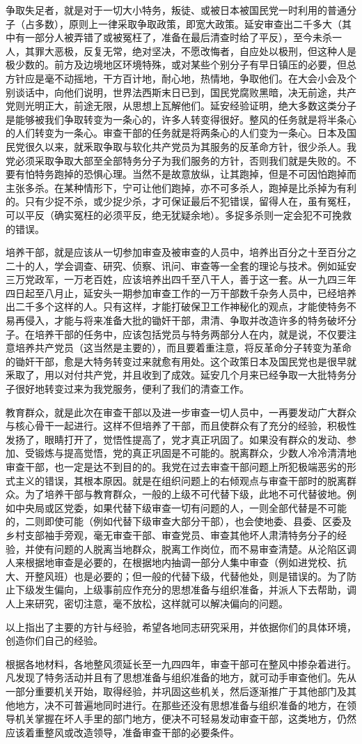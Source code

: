 争取失足者，就是对于一切大小特务，叛徒、或被日本被国民党一时利用的普通分子（占多数），原则上一律采取争取政策，即宽大政策。延安审查出二千多大（其中有一部分人被弄错了或被冤枉了，准备在最后清查时给了平反），至今未杀一人，其罪大恶极，反复无常，绝对坚决，不愿改悔者，自应处以极刑，但这种人是极少数的。前方及边境地区环境特殊，或对某些个别分子有早日镇压的必要，但总方针应是毫不动摇地，干方百计地，耐心地，热情地，争取他们。在大会小会及个别谈话中，向他们说明，世界法西斯末日已到，国民党腐败黑暗，决无前途，共产党则光明正大，前途无限，从思想上瓦解他们。延安经验证明，绝大多数这类分子是能够被我们争取转变为一条心的，许多人转变得很好。整风的任务就是将半条心的人们转变为一条心。审查干部的任务就是将两条心的人们变为一条心。日本及国民党很久以来，就釆取争取与软化共产党员为其服务的反革命方针，很少杀人。我党必须采取争取大部至全部特务分子为我们服务的方针，否则我们就是失败的。不要有怕特务跑掉的恐惧心理。当然不是故意放纵，让其跑掉，但是不可因怕跑掉而主张多杀。在某种情形下，宁可让他们跑掉，亦不可多杀人，跑掉是比杀掉为有利的。只有少捉不杀，或少捉少杀，才可保证最后不犯错误，留得人在，虽有冤枉，可以平反（确实冤枉的必须平反，绝无犹疑余地）。多捉多杀则一定会犯不可挽救的错误。

培养干部，就是应该从一切参加审查及被审查的人员中，培养出百分之十至百分之二十的人，学会调查、研究、侦察、讯问、审查等一全套的理论与技术。例如延安三万党政军，一万老百姓，应该培养出四千至八干人，善于这一套。从一九四三年四日起至八月止，延安头一期参加审查工作的一万干部数千杂务人员中，已经培养出二千多个这样的人。只有这样，才能打破保卫工作神秘化的观点，才能使特务不易再侵入，才能与将来准备大批的锄奸干部，肃清、争取并改造许多的特务破坏分子。在培养干部的任务中，应该包括党员与特务两部分人在内，就是说，不仅要注意培养共产党员（这当然是主要的），而且要着重注意，将反革命分子转变为革命的锄奸干部，愈是大特务转变过来就愈有用处。这个政策日本及国民党也是很早就釆取了，用以对付共产党，并且收到了成效。延安几个月来已经争取一大批特务分子很好地转变过来为我党服务，便利了我们的清查工作。

教育群众，就是此次在审查干部以及进一步审查一切人员中，一再要发动广大群众与核心骨干一起进行。这样不但培养了干部，而且使群众有了充分的经验，积极性发扬了，眼睛打开了，觉悟性提高了，党才真正巩固了。如果没有群众的发动、参加、受锻炼与提高觉悟，党的真正巩固是不可能的。脱离群众，少数人冷冷清清地审查干部，也一定是达不到目的的。我党在过去审查干部问题上所犯极端恶劣的形式主义的错误，其根本原因。就是在组织问题上的右倾观点与审查干部时的脱离群众。为了培养干部与教育群众，一般的上级不可代替下级，此地不可代替彼地。例如中央局或区党委，如果代替下级审查一切有问题的人，一则全部代替是不可能的，二则即使可能（例如代替下级审查大部分干部），也会使地委、县委、区委及乡村支部袖手旁观，毫无审查干部、审查党员、审查其他坏人肃清特务分子的经验，并使有问题的人脱离当地群众，脱离工作岗位，而不易审查清楚。从沦陷区调人来根据地审查是必要的，在根据地内抽调一部分人集中审查（例如进党校、抗大、开整风班）也是必要的；但一般的代替下级，代替他处，则是错误的。为了防止下级发生偏向，上级事前应作充分的思想准备与组织准备，并派人下去帮助，调人上来研究，密切注意，毫不放松，这样就可以解决偏向的问题。

以上指出了主要的方针与经验，希望各地同志研究采用，并依据你们的具体环境，创造你们自己的经验。

根据各地材料，各地整风须延长至一九四四年，审查干部可在整风中掺杂着进行。凡发现了特务活动并且有了思想准备与组织准备的地方，就可动手审查他们。先从一部分重要机关开始，取得经验，并巩固这些机关，然后逐渐推广于其他部门及其他地方，决不可普遍地同时进行。在那些还没有思想准备与组织准备的地方，在领导机关掌握在坏人手里的部门地方，便决不可轻易发动审查干部，这类地方，仍然应该着重整风或改造领导，准备审查干部的必要条件。


